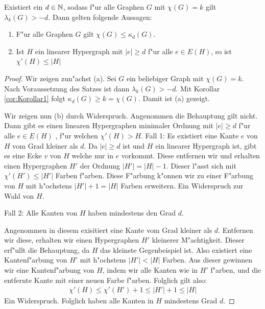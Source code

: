 \begin{theorem}
  \label{thm:MainTheorem}
  Existiert ein $d\in {\mathbb{N}}$, sodass f"ur alle  Graphen $G$ mit $\chi(G) = k $ gilt $ \lambda_{k}(G) > -d$. Dann gelten folgende Aussagen:
  \begin{enumerate}[label=(\alph*)]
    \item F"ur alle Graphen $G$ gilt $\chi(G) \leq \kappa_d (G)$.
    \item  Ist $H$ ein linearer Hypergraph mit $\left|e\right| \geq d$ f"ur alle $e\in E(H)$, so ist $\chi'\left( H \right)\leq \left|H\right| $
  \end{enumerate}
\end{theorem}

\begin{proof}
  Wir zeigen zun"achst (a). Sei $G$ ein beliebiger Graph mit $\chi(G) = k$. Nach Voraussetzung des Satzes ist dann $\lambda_{k}\left( G \right) > -d$. Mit Korollar \ref{cor:Korollar1} folgt $\kappa_{d}\left( G \right) \geq k = \chi\left( G \right)$. 
  Damit ist (a) gezeigt. 

  Wir zeigen nun (b) durch Widerspruch. Angenommen die Behauptung gilt nicht. Dann gibt es einen linearen Hypergraphen minimaler Ordnung mit $|e| \geq d$ f"ur alle $e\in E(H)$ , f"ur welchen $\chi'(H) > H$. 
  Fall 1: Es existiert eine Kante $e$ von $H$ vom Grad kleiner als $d$. Da $|e| \geq d$ ist und $H$ ein linearer Hypergraph ist, gibt es eine Ecke $v$ von $H$ welche nur in $e$ vorkommt. Diese entfernen wir und erhalten einen Hypergraphen $H'$ der Ordnung $|H'| = |H|-1$. Dieser l"asst sich mit $\chi'(H') \leq |H'|$ Farben f"arben. Diese F"arbung k"onnen wir zu einer F"arbung von $H$ mit h"ochstens $|H'|+1 = |H|$ Farben erweitern. Ein Widerspruch zur Wahl von $H$.

  Fall 2: Alle Kanten von $H$ haben mindestens den Grad $d$. 

  Angenommen in diesem exisitiert eine Kante vom Grad kleiner als $d$. Entfernen wir diese, erhalten wir einen Hypergraphen $H'$ kleinerer M"achtigkeit.
  Dieser erf"ullt die Behauptung, da $H$ das kleinste Gegenbeispiel ist. Also existiert eine Kantenf"arbung von $H'$ mit h"ochstens $|H'| < |H|$ Farben. Aus dieser gewinnen wir eine Kantenf"arbung von $H$, indem wir alle Kanten wie in $H'$ f"arben, und die entfernte Kante mit einer neuen Farbe f"arben. Folglich gilt also:
  \begin{align*}
    \chi'(H) \leq \chi'(H') +1 \leq |H'|+1 \leq |H|
  \end{align*}
  Ein Widerspruch. Folglich haben alle Kanten in $H$ mindestens Grad $d$. 


\end{proof}
